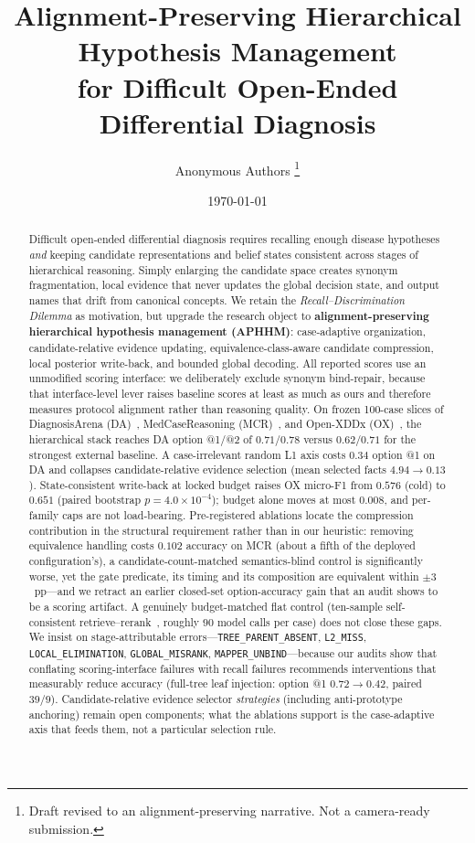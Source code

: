 \documentclass[11pt,a4paper]{article}
\title{%
Alignment-Preserving Hierarchical Hypothesis Management\\
for Difficult Open-Ended Differential Diagnosis%
}
\author{%
Anonymous Authors%
\thanks{Draft revised to an alignment-preserving narrative. Not a camera-ready submission.}%
}
\date{\today}
\begin{document}
\maketitle

\begin{abstract}
Difficult open-ended differential diagnosis requires recalling enough disease hypotheses \emph{and} keeping candidate representations and belief states consistent across stages of hierarchical reasoning.
Simply enlarging the candidate space creates synonym fragmentation, local evidence that never updates the global decision state, and output names that drift from canonical concepts.
We retain the \emph{Recall--Discrimination Dilemma} as motivation, but upgrade the research object to \textbf{alignment-preserving hierarchical hypothesis management (APHHM)}: case-adaptive organization, candidate-relative evidence updating, equivalence-class-aware candidate compression, local posterior write-back, and bounded global decoding.
All reported scores use an unmodified scoring interface: we deliberately exclude synonym bind-repair, because that interface-level lever raises baseline scores at least as much as ours and therefore measures protocol alignment rather than reasoning quality.
On frozen 100-case slices of DiagnosisArena (DA)~\cite{diagnosisarena}, MedCaseReasoning (MCR)~\cite{medcasereasoning}, and Open-XDDx (OX)~\cite{dualinf2025}, the hierarchical stack reaches DA option @1/@2 of $0.71/0.78$ versus $0.62/0.71$ for the strongest external baseline.
A case-irrelevant random L1 axis costs $0.34$ option @1 on DA and collapses candidate-relative evidence selection (mean selected facts $4.94\rightarrow0.13$).
State-consistent write-back at locked budget raises OX micro-F1 from $0.576$ (cold) to $0.651$ (paired bootstrap $p{=}4.0{\times}10^{-4}$); budget alone moves at most $0.008$, and per-family caps are not load-bearing.
Pre-registered ablations locate the compression contribution in the structural requirement rather than in our heuristic: removing equivalence handling costs $0.102$ accuracy on MCR (about a fifth of the deployed configuration's), a candidate-count-matched semantics-blind control is significantly worse, yet the gate predicate, its timing and its composition are equivalent within $\pm 3$~pp---and we retract an earlier closed-set option-accuracy gain that an audit shows to be a scoring artifact.
A genuinely budget-matched flat control (ten-sample self-consistent retrieve--rerank~\cite{wang2023selfconsistency,rrf2009}, roughly $90$ model calls per case) does not close these gaps.
We insist on stage-attributable errors---\texttt{TREE\_PARENT\_ABSENT}, \texttt{L2\_MISS}, \texttt{LOCAL\_ELIMINATION}, \texttt{GLOBAL\_MISRANK}, \texttt{MAPPER\_UNBIND}---because our audits show that conflating scoring-interface failures with recall failures recommends interventions that measurably reduce accuracy (full-tree leaf injection: option @1 $0.72\rightarrow0.42$, paired $39/9$).
Candidate-relative evidence selector \emph{strategies} (including anti-prototype anchoring) remain open components; what the ablations support is the case-adaptive axis that feeds them, not a particular selection rule.
\end{abstract}
\end{document}
